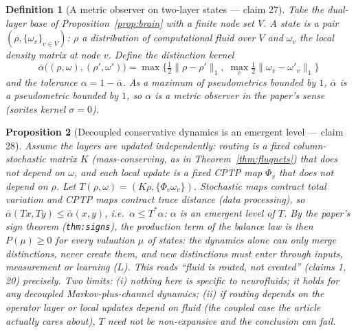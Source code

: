 \documentclass[11pt,a4paper]{article}
\newtheorem{definition}{Definition}[section]
\newtheorem{proposition}[definition]{Proposition}
\begin{document}
\begin{definition}[A metric observer on two-layer states --- claim 27]
\label{def:v2-dual}
Take the dual-layer base of Proposition~\ref{prop:brain} with a finite node
set $V$. A state is a pair $(\rho,\{\omega_v\}_{v\in V})$: $\rho$ a
distribution of computational fluid over $V$ and $\omega_v$ the local density
matrix at node $v$. Define the distinction kernel
\[
  \bar\alpha\big((\rho,\omega),(\rho',\omega')\big)=
  \max\Big\{\tfrac12\|\rho-\rho'\|_1,\;\max_v\tfrac12\|\omega_v-\omega'_v\|_1\Big\}
\]
and the tolerance $\alpha=1-\bar\alpha$. As a maximum of pseudometrics bounded
by $1$, $\bar\alpha$ is a pseudometric bounded by $1$, so $\alpha$ is a
\emph{metric} observer in the paper's sense (sorites kernel $\sigma=0$).
\end{definition}

\begin{proposition}[Decoupled conservative dynamics is an emergent level --- claim 28]
\label{prop:v2-dpi}
\emph{Assume the layers are updated independently}: routing is a fixed
column-stochastic matrix $K$ (mass-conserving, as in
Theorem~\ref{thm:fluqnets}) that does not depend on $\omega$, and each local
update is a fixed CPTP map $\Phi_v$ that does not depend on $\rho$. Let
$T(\rho,\omega)=(K\rho,\{\Phi_v\omega_v\})$. Stochastic maps contract total
variation and CPTP maps contract trace distance (data processing), so
$\bar\alpha(Tx,Ty)\le\bar\alpha(x,y)$, i.e.\ $\alpha\le T^{*}\alpha$: $\alpha$
is an \emph{emergent level} of $T$. By the paper's sign theorem
(\texttt{thm:signs}), the production term of the balance law is then
$P(\mu)\ge0$ for every valuation $\mu$ of states: the dynamics alone can only
merge distinctions, never create them, and new distinctions must enter through
inputs, measurement or learning ($L$). This reads ``fluid is routed, not
created'' (claims 1, 20) precisely. Two limits: (i) nothing here is specific to
neurofluids; it holds for any decoupled Markov-plus-channel dynamics; (ii) if
routing depends on the operator layer or local updates depend on fluid
(the coupled case the article actually cares about), $T$ need not be
non-expansive and the conclusion can fail.
\end{proposition}
\end{document}

